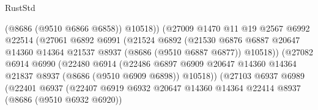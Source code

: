 \begin{lexlean}{RustStd}
\begin{coremodule}
                                      (@8686 (@9510 @6866 @6858))
                                      @10518))
                                  (@27009
                                    @1470
                                    @11
                                    @19
                                    @2567
                                    @6992
                                    @22514
                                    (@27061
                                      @6892
                                      @6991
                                      (@21524
                                        @6892
                                        (@21530
                                          @6876
                                          @6887
                                          @20647
                                          @14360
                                          @14364
                                          @21537
                                          @8937
                                          (@8686 (@9510 @6887 @6877))
                                          @10518))
                                      (@27082
                                        @6914
                                        @6990
                                        (@22480
                                          @6914
                                          (@22486
                                            @6897
                                            @6909
                                            @20647
                                            @14360
                                            @14364
                                            @21837
                                            @8937
                                            (@8686 (@9510 @6909 @6898))
                                            @10518))
                                        (@27103
                                          @6937
                                          @6989
                                          (@22401
                                            @6937
                                            (@22407
                                              @6919
                                              @6932
                                              @20647
                                              @14360
                                              @14364
                                              @22414
                                              @8937
                                              (@8686 (@9510 @6932 @6920))

\end{coremodule}
\end{lexlean}
